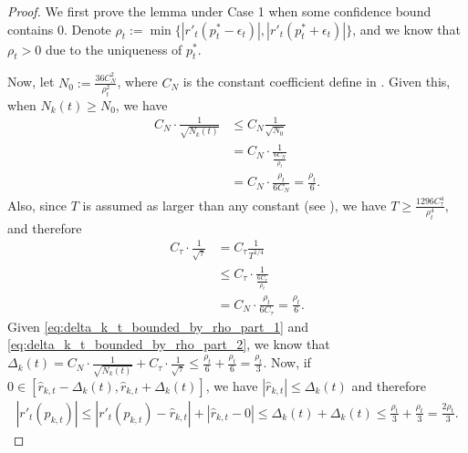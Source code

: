 \begin{proof}
    We first prove the lemma under Case 1 when some confidence bound contains $0$. Denote $\rho_t:=\min\{|r'_t(p_t^*-\epsilon_t)|, |r'_t(p_t^*+\epsilon_t)|\}$, and we know that $\rho_t>0$ due to the uniqueness of $p_t^*$.

    Now, let $N_0:=\frac{36C_N^2}{\rho_t^2}$, where $C_N$ is the constant coefficient define in . Given this, when $N_k(t)\geq N_0$, we have
    \begin{equation}
        \label{eq:delta_k_t_bounded_by_rho_part_1}
        \begin{aligned}
            C_N\cdot\frac1{\sqrt{N_k(t)}}&\leq C_N\frac1{\sqrt{N_0}}\\
            &=C_N\cdot\frac1{\frac{6C_N}{\rho_t}}\\
            &=C_N\cdot\frac{\rho_t}{6C_N}=\frac{\rho_t}6.
        \end{aligned}
    \end{equation}
    Also, since $T$ is assumed as larger than any constant (see ), we have $T\geq\frac{1296C_{\tau}^4}{\rho_t^4}$, and therefore
    \begin{equation}
        \label{eq:delta_k_t_bounded_by_rho_part_2}
        \begin{aligned}
            C_{\tau}\cdot\frac1{\sqrt{\tau}}&= C_{\tau}\frac1{T^{1/4}}\\
            &\leq C_{\tau}\cdot\frac1{\frac{6C_{\tau}}{\rho_t}}\\
            &=C_N\cdot\frac{\rho_t}{6C_{\tau}}=\frac{\rho_t}6.
        \end{aligned}
    \end{equation}
    Given \cref{eq:delta_k_t_bounded_by_rho_part_1} and \cref{eq:delta_k_t_bounded_by_rho_part_2}, we know that $\Delta_k(t) = C_N\cdot\frac1{\sqrt{N_k(t)}} + C_{\tau}\cdot\frac1{\sqrt{\tau}}\leq\frac{\rho_t}6 + \frac{\rho_t}6 = \frac{\rho_t}3$. Now, if $0\in[\hat r_{k,t}-\Delta_k(t), \hat r_{k,t}+\Delta_k(t)]$, we have $|\hat r_{k,t}|\leq\Delta_k(t)$ and therefore
    \begin{equation}
        \label{eq:case_1_derivative_upper_bound_by_delta_k_t}
        \begin{aligned}
            |r'_t(p_{k,t})|\leq|r'_t(p_{k,t}) - \hat r_{k,t}| + |\hat r_{k,t} - 0| \leq \Delta_k(t) + \Delta_k(t) \leq \frac{\rho_t}3 + \frac{\rho_t}3 = \frac{2\rho_t}3.
        \end{aligned}
    \end{equation}

\end{proof}

